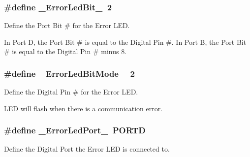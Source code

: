 \hypertarget{launchPad_8ino_a5504a284db73f254a1d5871844f6987c}{
\subsubsection[{\-\_\-\-Error\-Led\-Bit\-\_\-}]{\setlength{\rightskip}{0pt plus 5cm}\#define {\bf \-\_\-\-Error\-Led\-Bit\-\_\-}~2}}\label{launchPad_8ino_a5504a284db73f254a1d5871844f6987c}


\-Define the \-Port \-Bit \# for the \-Error \-L\-E\-D. 

\-In \-Port \-D, the \-Port \-Bit \# is equal to the \-Digital \-Pin \#. \-In \-Port \-B, the \-Port \-Bit \# is equal to the \-Digital \-Pin \# minus 8. \hypertarget{launchPad_8ino_afff5f53ef0f1c562a5dce2243aef6c53}{
\subsubsection[{\-\_\-\-Error\-Led\-Bit\-Mode\-\_\-}]{\setlength{\rightskip}{0pt plus 5cm}\#define {\bf \-\_\-\-Error\-Led\-Bit\-Mode\-\_\-}~2}}\label{launchPad_8ino_afff5f53ef0f1c562a5dce2243aef6c53}


\-Define the \-Digital \-Pin \# for the \-Error \-L\-E\-D. 

\-L\-E\-D will flash when there is a communication error. \hypertarget{launchPad_8ino_affac57d4321e3e0a2ffd81bce3d8ac87}{
\subsubsection[{\-\_\-\-Error\-Led\-Port\-\_\-}]{\setlength{\rightskip}{0pt plus 5cm}\#define {\bf \-\_\-\-Error\-Led\-Port\-\_\-}~\-P\-O\-R\-T\-D}}\label{launchPad_8ino_affac57d4321e3e0a2ffd81bce3d8ac87}


\-Define the \-Digital \-Port the \-Error \-L\-E\-D is connected to. 

